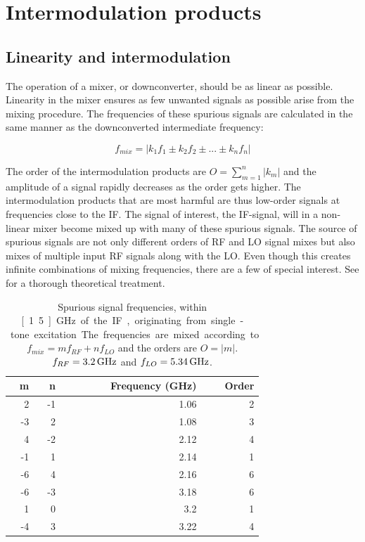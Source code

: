 	\section{Intermodulation products}
		\subsection{Linearity and intermodulation}
			The operation of a mixer, or downconverter, should be as linear as possible. Linearity in the mixer ensures as few unwanted signals as possible arise from the mixing procedure. The frequencies of these spurious signals are calculated in the same manner as the downconverted intermediate frequency:\autocite{bahl03}

			\begin{equation}\label{eq:spurs}
				f_{mix} = |k_1f_1\pm k_2f_2 \pm ... \pm k_nf_n|
			\end{equation}

			The order of the intermodulation products are $O=\sum_{m=1}^n|k_m|$ and the amplitude of a signal rapidly decreases as the order gets higher. The intermodulation products that are most harmful are thus low-order signals at frequencies close to the IF. The signal of interest, the IF-signal, will in a non-linear mixer become mixed up with many of these spurious signals. The source of spurious signals are not only different orders of RF and LO signal mixes but also mixes of multiple input RF signals along with the LO. Even though this creates infinite combinations of mixing frequencies, there are a few of special interest. See \citeauthor{kundert02} for a thorough theoretical treatment\autocite{kundert02}.


			\begin{table}[hbt!]
			\caption[Single-tone spurious signals.]{Spurious signal frequencies, within \unit[1.5]{GHz} of the IF, originating from single-tone excitation. The frequencies are mixed according to $f_{mix} = mf_{RF} + nf_{LO}$ and the orders are $O=|m|$. $ f_{RF}=\unit[3.2]{GHz}$ and $ f_{LO}=\unit[5.34]{GHz}$.}
			\label{tab:introsingletone}
			\centering
			\begin{tabular}{rrrr}
				m & n & Frequency (GHz) & Order \\\hline
				  2 &  -1 & 1.06 & 2 \\
				 -3 &   2 & 1.08 & 3 \\
				  4 &  -2 & 2.12 & 4 \\
				 -1 &   1 & 2.14 & 1 \\
				 -6 &   4 & 2.16 & 6 \\
				 -6 &  -3 & 3.18 & 6 \\
				  1 &   0 &  3.2 & 1 \\
				 -4 &   3 & 3.22 & 4
			\end{tabular}
			\end{table}

